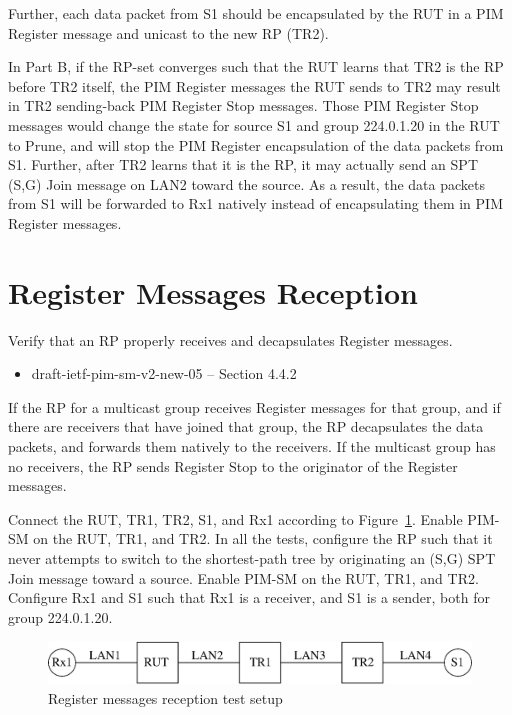 \documentclass[11pt]{report}
\begin{document}
\begin{itemize}
  Further, each data packet from S1 should be encapsulated by the RUT in a PIM
  Register message and unicast to the new RP (TR2).

\end{itemize}


In Part B, if the RP-set converges such that the RUT learns that TR2 is the RP
before TR2 itself, the PIM Register messages the RUT sends to TR2 may result
in TR2 sending-back PIM Register Stop messages. Those PIM Register Stop
messages would change the state for source S1 and group 224.0.1.20 in the RUT
to Prune, and will stop the PIM Register encapsulation of the data packets
from S1. Further, after TR2 learns that it is the RP, it may actually send an
SPT (S,G) Join message on LAN2 toward the source. As a result, the data
packets from S1 will be forwarded to Rx1 natively instead of encapsulating
them in PIM Register messages.

\newpage
\section{Register Messages Reception}

Verify that an RP properly receives and decapsulates Register messages.

\begin{itemize}
  \item draft-ietf-pim-sm-v2-new-05 -- Section 4.4.2
\end{itemize}

If the RP for a multicast group receives Register messages for that group,
and if there are receivers that have joined that group, the RP decapsulates
the data packets, and forwards them natively to the receivers. If the
multicast group has no receivers, the RP sends Register Stop to the originator
of the Register messages.

Connect the RUT, TR1, TR2, S1, and Rx1 according to
Figure~\ref{fig:pim_test_3_3_register_messages_reception}.
Enable PIM-SM on the RUT,
TR1, and TR2. In all the tests, configure the RP such that it never attempts to
switch to the shortest-path tree by originating an (S,G) SPT Join message
toward a source. Enable PIM-SM on the RUT, TR1, and TR2.  Configure Rx1 and S1
such that Rx1 is a receiver, and S1 is a sender, both for group 224.0.1.20.


\begin{figure}[htbp]
  \begin{center}
    \includegraphics[scale=0.8]{figs/pim_test_3_3_register_messages_reception}
    \caption{Register messages reception test setup}
    \label{fig:pim_test_3_3_register_messages_reception}
  \end{center}
\end{figure}
\end{document}
